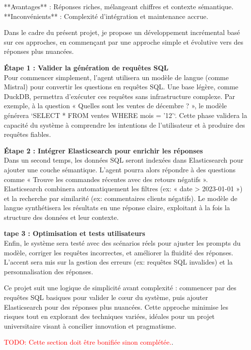 \documentclass[a4paper,11pt]{article}
\begin{document}
**Avantages** : Réponses riches, mélangeant chiffres et contexte sémantique.  
**Inconvénients** : Complexité d’intégration et maintenance accrue.  

Dans le cadre du présent projet, je propose un développement incrémental basé sur ces approches, en commençant par une approche simple et évolutive vers des réponses plus nuancées.

\textbf{Étape 1 : Valider la génération de requêtes SQL} \\  
Pour commencer simplement, l’agent utilisera un modèle de langue (comme Mistral) pour convertir les questions en requêtes SQL. Une base légère, comme DuckDB, permettra d’exécuter ces requêtes sans infrastructure complexe. Par exemple, à la question « Quelles sont les ventes de décembre ? », le modèle générera `SELECT * FROM ventes WHERE mois = '12'`. Cette phase validera la capacité du système à comprendre les intentions de l’utilisateur et à produire des requêtes fiables.  

\textbf{Étape 2 : Intégrer Elasticsearch pour enrichir les réponses} \\   
Dans un second temps, les données SQL seront indexées dans Elasticsearch pour ajouter une couche sémantique. L’agent pourra alors répondre à des questions comme « Trouve les commandes récentes avec des retours négatifs ». Elasticsearch combinera automatiquement les filtres (ex: « date > 2023-01-01 ») et la recherche par similarité (ex: commentaires clients négatifs). Le modèle de langue synthétisera les résultats en une réponse claire, exploitant à la fois la structure des données et leur contexte.  

\textbf{tape 3 : Optimisation et tests utilisateurs} \\ 
Enfin, le système sera testé avec des scénarios réels pour ajuster les prompts du modèle, corriger les requêtes incorrectes, et améliorer la fluidité des réponses. L’accent sera mis sur la gestion des erreurs (ex: requêtes SQL invalides) et la personnalisation des réponses.  


Ce projet suit une logique de simplicité avant complexité : commencer par des requêtes SQL basiques pour valider le cœur du système, puis ajouter Elasticsearch pour des réponses plus nuancées. Cette approche minimise les risques tout en explorant des techniques variées, idéales pour un projet universitaire visant à concilier innovation et pragmatisme.

\textcolor{red}{TODO: Cette section doit être bonifiée sinon complétée.}.
\end{document}

